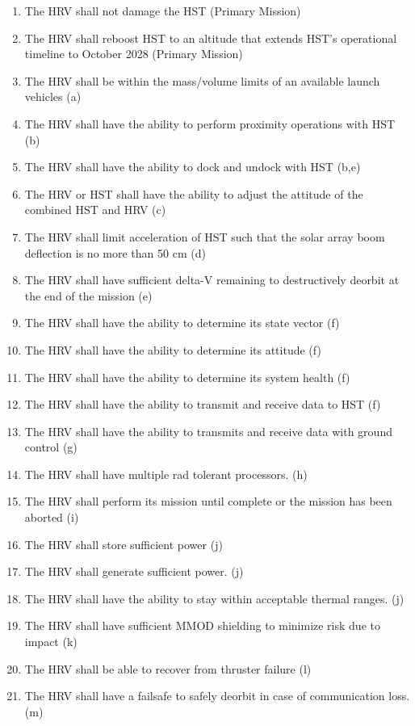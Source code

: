 \documentclass[paper=letter, fontsize=11pt]{scrartcl} %
\numberwithin{equation}{section} %
\numberwithin{figure}{section} %
\numberwithin{table}{section} %
\begin{document}
\begin{enumerate}
\item The HRV shall not damage the HST (Primary Mission)
\item The HRV shall reboost HST to an altitude that extends HST's operational timeline to October 2028 (Primary Mission)
\item The HRV shall be within the mass/volume limits of an available launch vehicles (a)
\item The HRV shall have the ability to perform proximity operations with HST (b)
\item The HRV shall have the ability to dock and undock with HST (b,e)
\item The HRV or HST shall have the ability to adjust the attitude of the combined HST and HRV (c)
\item The HRV shall limit acceleration of HST such that the solar array boom deflection is no more than 50 cm (d)
\item The HRV shall have sufficient delta-V remaining to destructively deorbit at the end of the mission (e)
\item The HRV shall have the ability to determine its state vector (f)
\item The HRV shall have the ability to determine its attitude (f)
\item The HRV shall have the ability to determine its system health (f)
\item The HRV shall have the ability to transmit and receive data to HST (f)
\item The HRV shall have the ability to transmits and receive data with ground control (g)
\item The HRV shall have multiple rad tolerant processors. (h)
\item The HRV shall perform its mission until complete or the mission has been aborted (i)
\item The HRV shall store sufficient power (j)
\item The HRV shall generate sufficient power. (j)
\item The HRV shall have the ability to stay within acceptable thermal ranges. (j)
\item The HRV shall have sufficient MMOD shielding to minimize risk due to impact (k)
\item The HRV shall be able to recover from thruster failure (l)
\item The HRV shall have a failsafe to safely deorbit in case of communication loss. (m)
\end{enumerate}
\end{document}

